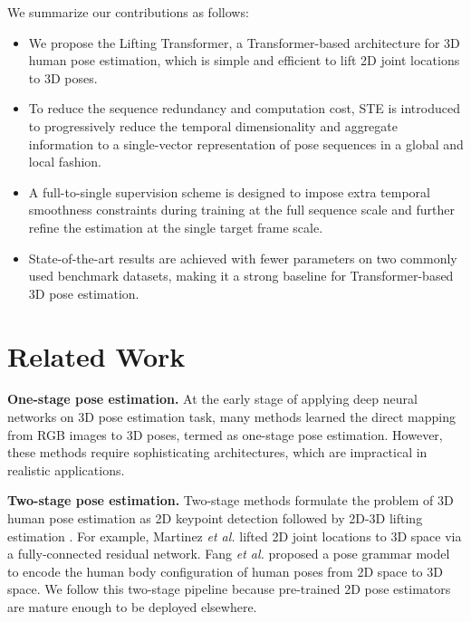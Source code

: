 \documentclass[10pt,twocolumn,letterpaper]{article}
\begin{document}
We summarize our contributions as follows:
\begin{itemize}
   \item We propose the Lifting Transformer, a Transformer-based architecture for 3D human pose estimation, which is simple and efficient to lift 2D joint locations to 3D poses. 
   \item To reduce the sequence redundancy and computation cost, STE is introduced to progressively reduce the temporal dimensionality and aggregate information to a single-vector representation of pose sequences in a global and local fashion.
   \item A full-to-single supervision scheme is designed to impose extra temporal smoothness constraints during training at the full sequence scale and further refine the estimation at the single target frame scale. 

   \item State-of-the-art results are achieved with fewer parameters on two commonly used benchmark datasets, making it a strong baseline for Transformer-based 3D pose estimation. 
\end{itemize}

\section{Related Work}
\textbf{One-stage pose estimation. }
At the early stage of applying deep neural networks on 3D pose estimation task, many methods \cite{pavlakos2017coarse,sun2018integral,zhao2019semantic,liu2019feature} learned the direct mapping from RGB images to 3D poses, termed as one-stage pose estimation.
However, these methods require sophisticating architectures, which are impractical in realistic applications.

\textbf{Two-stage pose estimation. }
Two-stage methods formulate the problem of 3D human pose estimation as 2D keypoint detection followed by 2D-3D lifting estimation \cite{martinez2017simple,fang2018learning,wandt2019repnet}. 
For example, Martinez \emph{et al.} \cite{martinez2017simple} lifted 2D joint locations to 3D space via a fully-connected residual network. 
Fang \emph{et al.} \cite{fang2018learning} proposed a pose grammar model to encode the human body configuration of human poses from 2D space to 3D space. 
We follow this two-stage pipeline because pre-trained 2D pose estimators \cite{chen2018cascaded} are mature enough to be deployed elsewhere. 
\end{document}
